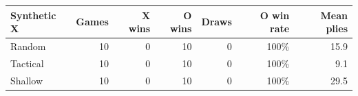 \begin{tabular}{lrrrrrr}
\toprule
Synthetic X & Games & X wins & O wins & Draws & O win rate & Mean plies \\
\midrule
Random & 10 & 0 & 10 & 0 & 100\% & 15.9 \\
Tactical & 10 & 0 & 10 & 0 & 100\% & 9.1 \\
Shallow & 10 & 0 & 10 & 0 & 100\% & 29.5 \\
\bottomrule
\end{tabular}
